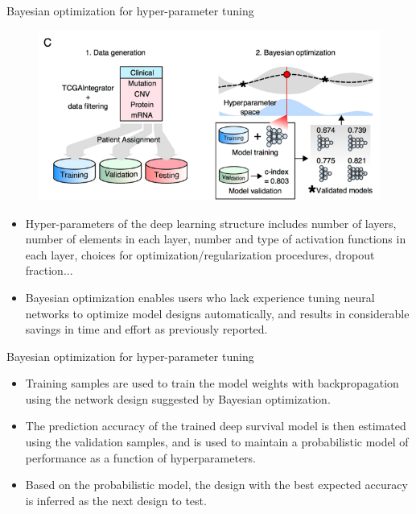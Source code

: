 \documentclass[
]{beamer}
\begin{document}
	\begin{frame}[plain]{Bayesian optimization for hyper-parameter tuning}
		\begin{figure}
			\includegraphics[scale=0.3]{bayes1}
		\end{figure}
		\begin{itemize}
			\item Hyper-parameters of the deep learning structure includes number of layers, number
			of elements in each layer,  number and type of activation functions in each layer,  choices for optimization/regularization procedures,  dropout fraction...
			\item Bayesian optimization enables users
			who lack experience tuning neural networks to optimize model designs automatically, and results in considerable
			savings in time and effort as previously reported.
		\end{itemize}
	\end{frame}
	
	\begin{frame}{Bayesian optimization for hyper-parameter tuning}
		\begin{itemize}
			\item Training samples are used to train the model weights with backpropagation using the network
			design suggested by Bayesian optimization.
			\item The prediction accuracy of the trained deep survival model is then
			estimated using the validation samples, and is used to maintain a probabilistic model of performance as a function
			of hyperparameters.
			\item  Based on the probabilistic model, the design with the best expected accuracy is inferred
			as the next design to test.
		\end{itemize}
	\end{frame}
	
\end{document}

